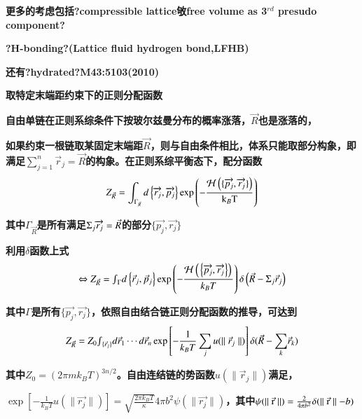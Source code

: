 \documentclass{article} %
\begin{document}
\noindent 
{\bf 更多的考虑包括?compressible lattice敂free volume as 3${}^{rd}$ presudo component?}

\noindent 
{\bf ?H-bonding?(Lattice fluid hydrogen bond,LFHB)}

\noindent 
{\bf 还有?hydrated?M43:5103(2010)}

\noindent \eject 

\noindent \textbf{取特定末端距约束下的正则分配函数}


{\bf  自由单链在正则系综条件下按玻尔兹曼分布的概率涨落，$\vec{R}$也是涨落的，}


{\bf  如果约束一根链取某固定末端距$\vec{R}$，则与自由条件相比，体系只能取部分构象，即满足$\sum _{j=1}^{n}\vec{r}_{j} =\vec{R} $的构象。在正则系综平衡态下，配分函数
\[Z_{\vec{R}} =\int _{\Gamma _{\vec{R}} }d\left\{\overrightarrow{r_{j} },\overrightarrow{p_{j} }\right\}\exp \left(-\frac{\mathrm{{\mathcal H}}\left(\{ \overrightarrow{p_{j} },\overrightarrow{r_{j} }\} \right)}{{\rm k}_{B} {\rm T}} \right) \] }

{\bf 其中$\Gamma _{\vec{R}} $是所有满足${\rm \Sigma }_{j} \overrightarrow{r_{j} }=\vec{R}$的部分$\{ \overrightarrow{p_{j} },\overrightarrow{r_{j} }\} $}

\noindent 
{\bf 利用$\delta $函数上式
\[\Leftrightarrow Z_{\vec{R}} ={\mathop{\smallint }\nolimits_{\Gamma }} d\left\{\vec{r}_{j} ,\vec{p}_{j} \right\}\exp \left(-\frac{\mathrm{{\mathcal H}}\left(\left. \left\{\overrightarrow{p_{j} },\overrightarrow{r_{j} }\right\}\right)\right. }{k_{B} T} \right)\delta \left(\vec{R}-{\rm \Sigma }_{j} \vec{r}_{j} \right)\] }

{\bf 其中$\Gamma $是所有$\{ \overrightarrow{p_{j} },\overrightarrow{r_{j} }\} $，依照自由结合链正则分配函数的推导，可达到
\[Z_{\vec{R}} =Z_{0} {\mathop{\smallint }\nolimits_{\{ \vec{r}_{j} \} }} d\vec{r}_{1} \cdots d\vec{r}_{n} \exp \left[-\frac{1}{k_{B} T} \sum _{j}u(\parallel \vec{r}_{j} \parallel ) \right]\delta (\vec{R}-{\mathop{\sum }\limits_{k}} \vec{r}_{k} )\] }

{\bf 其中$Z_{0} =(2\pi mk_{B} T)^{3n/2} $。自由连结链的势函数$u(\parallel \vec{r}_{j} \parallel )$满足， }

\noindent 
{\bf $\exp \left[-\frac{1}{k_{B} T} u(\parallel \overrightarrow{r_{j} }\parallel )\right]=\sqrt{\frac{2\pi k_{B} T}{\kappa } } 4\pi b^{2} \psi (\parallel \overrightarrow{r_{j} }\parallel )$，其中$\psi (\parallel \vec{{\rm r}}\parallel )=\frac{2}{4\pi b^{2} } \delta (\parallel \vec{{\rm r}}\parallel -b)$}
\end{document}
